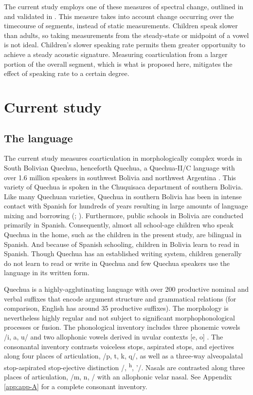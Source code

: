 \documentclass[a4paper,man,floatsintext,natbib,donotrepeattitle, apacite]{apa6}
\begin{document}
The current study employs one of these measures of spectral change, outlined in \citet{gerosaAnalyzingChildrenSpeech2006} and validated in \citet{cychoszSpectralTemporalMeasures2019}. This measure takes into account change occurring over the timecourse of segments, instead of static measurements. Children speak slower than adults, so taking measurements from the steady-state or midpoint of a vowel is not ideal.  Children's slower speaking rate permits them greater opportunity to achieve a steady acoustic signature. Measuring coarticulation from a larger portion of the overall segment, which is what is proposed here, mitigates the effect of speaking rate to a certain degree.

\section{Current study}

\subsection{The language}\label{the-language}

The current study measures coarticulation in morphologically complex words in South Bolivian Quechua, henceforth Quechua, a Quechua-II/C language with over 1.6 million speakers in southwest Bolivia and northwest Argentina \citep{toreroDialectosQuechuas1964}. This variety of Quechua is spoken in the Chuquisaca department of southern Bolivia. Like many Quechuan varieties, Quechua in southern Bolivia has been in intense contact with Spanish for hundreds of years resulting in large amounts of language mixing and borrowing (\citealt{muyskenContactsIndigenousLanguages2012}; \citealt{muyskenSpanishAffixesQuechua2012}). Furthermore, public schools in Bolivia are conducted primarily in Spanish. Consequently, almost all school-age children who speak Quechua in the home, such as the children in the present study, are bilingual in Spanish. And because of Spanish schooling, children in Bolivia learn to read in Spanish. Though Quechua has an established writing system, children generally do not learn to read or write in Quechua and few Quechua speakers use the language in its written form.

Quechua is a highly-agglutinating language with over 200 productive nominal and verbal suffixes that encode argument structure and grammatical relations (for comparison, English has around 35 productive suffixes). The morphology is nevertheless highly regular and not subject to significant morphophonological processes or fusion. The phonological inventory includes three phonemic vowels /i, a, u/ and two allophonic vowels derived in uvular contexts [e, o] \citep{gallagherVowelHeightAllophony2016}. The consonantal inventory contrasts voiceless stops, aspirated stops, and ejectives along four places of articulation, /p, t, k, q/, as well as a three-way alveopalatal stop-aspirated stop-ejective distinction /\textteshlig, \textteshlig\textsuperscript{h}, \textteshlig'/. Nasals are contrasted along three places of articulation, /m, n, \textltailn/ with an allophonic velar nasal. See Appendix \ref{app:app-A} for a complete consonant inventory. 
\end{document}
